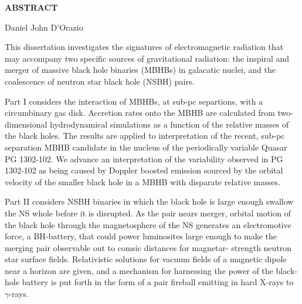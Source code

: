 \thispagestyle{empty}
\begin{center}

{\Large \bf ABSTRACT}

\vspace{.35in}
{\large \bf \thesistitle}

\vspace{.35in}

{\large Daniel John D'Orazio} \\
\vspace{.35in}
\end{center}
%

This dissertation investigates the signatures of electromagnetic radiation
that may accompany two specific sources of gravitational radiation: the
inspiral and merger of massive black hole binaries (MBHBs) in galacatic
nuclei, and the coalescence of neutron star black hole (NSBH) pairs. 

Part I considers the interaction of MBHBs, at sub-pc separtions, with a
circumbinary gas disk. Accretion rates onto the MBHB are calculated from two-dimensional 
hydrodynamical simulations as a function of the relative masses of
the black holes. The results are applied to interpretation of the recent, sub-pc 
separation MBHB candidate in the nucleus of the periodically variable
Quasar PG 1302-102. We advance an interpretation of the variability observed
in PG 1302-102 as being caused by Doppler boosted emission sourced by the
orbital velocity of the smaller black hole in a MBHB with disparate relative masses.

Part II considers NSBH binaries in which the black hole is large enough
swallow the NS whole before it is disrupted. As the pair nears merger, orbital
motion of the black hole through the magnetosphere of the NS generates an
electromotive force, a BH-battery, that could power luminosites large enough
to make the merging pair observable out to comsic distances for magnetar-
strength neutron star surface fields. Relativistic solutions for vacuum fields
of a magnetic dipole near a horizon are given, and a mechanism for harnessing
the power of the black-hole battery is put forth in the form of a pair
fireball emitting in hard X-rays to $\gamma$-rays.
